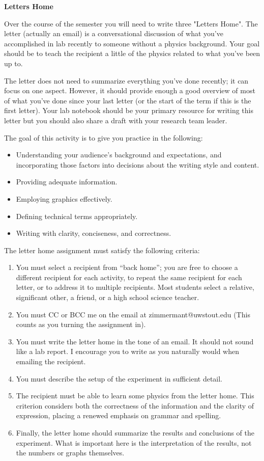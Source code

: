 \documentclass[12pt, letterpaper]{article}
\begin{document}
\textbf{\Large Letters Home}

Over the course of the semester you will need to write three "Letters Home".  The letter (actually an email) is a conversational discussion of what you've accomplished in lab recently to someone without a physics background.  Your goal should be to teach the recipient a little of the physics related to what you've been up to.

The letter does not need to summarize everything you've done recently; it can focus on one aspect.  However, it should provide enough a good overview of most of what you've done since your last letter (or the start of the term if this is the first letter).  Your lab notebook should be your primary resource for writing this letter but you should also share a draft with your research team leader.

The goal of this activity is to give you practice in the following:
\begin{itemize}

\item Understanding your audience’s background and expectations, and incorporating those factors into decisions
about the writing style and content.

\item Providing adequate information.

 \item Employing graphics effectively.

\item Defining technical terms appropriately.

\item Writing with clarity, conciseness, and correctness.
\end{itemize}

The letter home assignment must satisfy the following criteria: 
\begin{enumerate}
\item You must select a recipient from “back home”; you are free to choose a different recipient for each activity, to repeat the same recipient for each letter, or to address it to multiple recipients. Most students select a relative, significant other, a friend, or a high school science teacher. 
\item You must CC or BCC me on the email at zimmermant@uwstout.edu  (This counts as you turning the assignment in).
\item You must write the letter home in the tone of an email. It should not sound like a lab report. I encourage you to write as you naturally would when emailing the recipient. 
\item You must describe the setup of the experiment in sufficient detail. 
\item The recipient must be able to learn some physics from the letter home. This criterion considers both the correctness of the information and the clarity of expression, placing a renewed emphasis on grammar and spelling. 
\item Finally, the letter home should summarize the results and conclusions of the experiment.  What is important here is the interpretation of the results, not the numbers or graphs themselves.
\end{enumerate}
\end{document}
